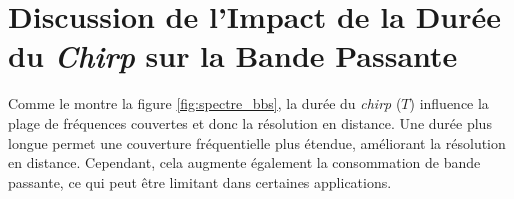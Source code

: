 \section {Discussion de l'Impact de la Durée du \textit{Chirp} sur la Bande Passante}

Comme le montre la figure \ref{fig:spectre_bbs}, la durée du \textit{chirp} ($T$)  influence la plage de fréquences couvertes et donc la résolution en distance. Une durée plus longue permet une couverture fréquentielle plus étendue, améliorant la résolution en distance. Cependant, cela augmente également la consommation de bande passante, ce qui peut être limitant dans certaines applications.

